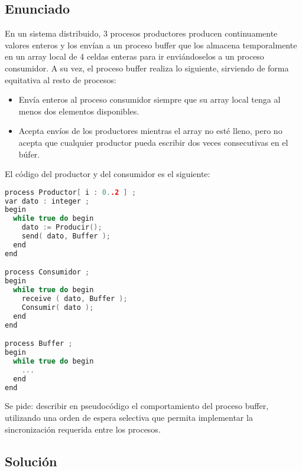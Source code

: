\documentclass[a4paper,12pt]{article}
\begin{document}
\subsection{Enunciado}
En un sistema distribuido, 3 procesos productores producen continuamente valores enteros y los envían a un proceso buffer que los almacena temporalmente en un array local de 4 celdas enteras para ir enviándoselos a un proceso consumidor. A su vez, el proceso buffer realiza lo siguiente, sirviendo de forma equitativa al resto de procesos:
\begin{itemize}
  \item Envía enteros al proceso consumidor siempre que su array local tenga al menos dos elementos disponibles.
  \item Acepta envíos de los productores mientras el array no esté lleno, pero no acepta que cualquier productor pueda escribir dos veces consecutivas en el búfer.
\end{itemize}

El código del productor y del consumidor es el siguiente:

\lstset{style=customcpp}

\begin{lstlisting}[language=C++]
process Productor[ i : 0..2 ] ;
var dato : integer ;
begin
  while true do begin
    dato := Producir();
    send( dato, Buffer );
  end
end

process Consumidor ;
begin
  while true do begin
    receive ( dato, Buffer );
    Consumir( dato );
  end
end

process Buffer ;
begin
  while true do begin
    ...
  end
end
\end{lstlisting}

Se pide: describir en pseudocódigo el comportamiento del proceso buffer, utilizando una orden de espera selectiva que permita implementar la sincronización requerida entre los procesos.

\subsection{Solución}
\end{document}
